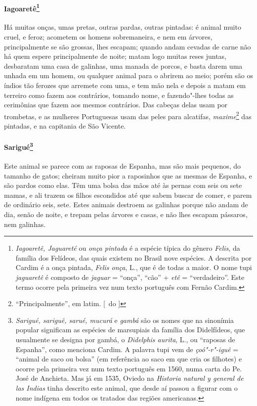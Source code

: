 \paragraph{Iagoaretê\footnote{ \textit{Iagoaretê, Jaguareté} ou
\textit{onça pintada } é a espécie típica do gênero \textit{Felis}, da
família dos Felídeos, das quais existem no Brasil nove espécies. A
descrita por Cardim é a onça pintada, \textit{Felis onça}, L., que é de
todas a maior. O nome tupi \textit{jaguaretê} é composto de
\textit{jaguar} = ``onça'', ``cão'' + \textit{etê} = ``verdadeiro''. Este
termo ocorre pela primeira vez num texto português com Fernão Cardim.}}
Há muitas onças, umas pretas, outras pardas, outras pintadas: é animal
muito cruel, e feroz; acometem os homens sobremaneira, e nem em
árvores, principalmente se são grossas, lhes escapam; quando andam
cevadas de carne não há quem espere principalmente de noite; matam logo
muitas reses juntas, desbaratam uma casa de galinhas, uma manada de
porcos, e basta darem uma unhada em um homem, ou qualquer animal para o
abrirem ao meio; porém são os índios tão ferozes que arremete com uma,
e tem mão nela e depois a matam em terreiro como fazem aos contrários,
tomando nome, e fazendo"-lhes todas as cerimônias que fazem aos mesmos
contrários. Das cabeças delas usam por trombetas, e as mulheres
Portuguesas usam das peles para alcatifas, \textit{maxime}\footnote{ ``Principalmente'', em latim. [~do ]} das pintadas, e na
capitania de São Vicente.

\paragraph{Sarigué\footnote{ \textit{Sarigué, sariguê, sarué,
mucurá} e \textit{gambá} são os nomes que na sinonímia popular
significam as espécies de marsupiais da família dos Didelfídeos, que
usualmente se designa por gambá, o \textit{Didelphis aurita}, 
L., ou ``raposas de Espanha'', como menciona Cardim. A
palavra tupi vem de \textit{çoó"-r"-iguê} = ``animal de saco ou bolsa'' 
(em referência ao saco em que cria os filhotes) e ocorre pela primeira
vez num texto português em 1560, numa carta do Pe. José de
Anchieta. Mas já em 1535, Oviedo na \textit{Historia natural y general
de las Indias} tinha descrito este animal, que desde aí passou a
figurar com o nome indígena em todos os tratados das regiões
americanas.}} Este animal se parece com as raposas de Espanha,
mas são mais pequenos, do tamanho de gatos; cheiram muito pior a
raposinhos que as mesmas de Espanha, e são pardos como elas. Têm uma
bolsa das mãos até às pernas com seis ou sete mamas, e ali trazem os
filhos escondidos até que sabem buscar de comer, e parem de ordinário
seis, sete. Estes animais destroem as galinhas porque não andam de dia,
senão de noite, e trepam pelas árvores e casas, e não lhes escapam
pássaros, nem galinhas. 

